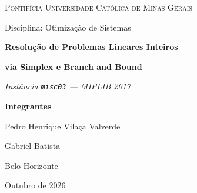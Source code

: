 \begin{titlepage}
\centering
\thispagestyle{empty}
\vspace*{1.2cm}

{\scshape\Large Pontifícia Universidade Católica de Minas Gerais\par}
\vspace{0.5cm}
{\large Disciplina: Otimização de Sistemas\par}

\vspace{3.2cm}
{\Huge\bfseries Resolução de Problemas Lineares Inteiros\par}
\vspace{0.4cm}
{\Huge\bfseries via Simplex e Branch and Bound\par}

\vspace{1.4cm}
{\Large\itshape Instância \texttt{misc03} --- MIPLIB 2017\par}

\vspace{3.2cm}
{\large\textbf{Integrantes}\par}
\vspace{0.5cm}
{\Large Pedro Henrique Vilaça Valverde\par}
\vspace{0.2cm}
{\Large Gabriel Batista\par}

\vfill
{\large Belo Horizonte\par}
{\large Outubro de 2026\par}
\end{titlepage}
